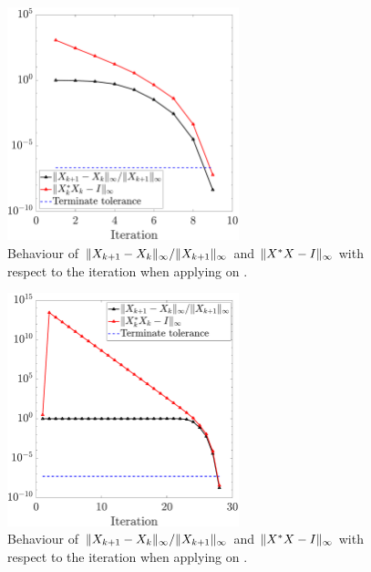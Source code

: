 \documentclass[12pt]{article}
\begin{document}
\begin{figure}[H]
    \centering
    \includegraphics[width=0.6\textwidth]{../code/randn100.pdf}
    \caption{Behaviour of $\|{X_{k+1} - X_{k}}\|_\infty/\|{X_{k+1}}\|_\infty$ and $\|{X^* X - I}\|_\infty$ with respect to the iteration when applying  on .}
\end{figure}

\begin{figure}[H]
    \centering
    \includegraphics[width=0.6\textwidth]{../code/hilb6.pdf}
    \caption{Behaviour of $\|{X_{k+1} - X_{k}}\|_\infty/\|{X_{k+1}}\|_\infty$ and $\|{X^* X - I}\|_\infty$ with respect to the iteration when applying  on .}
    \label{fig:hilb6}
\end{figure}
\end{document}

